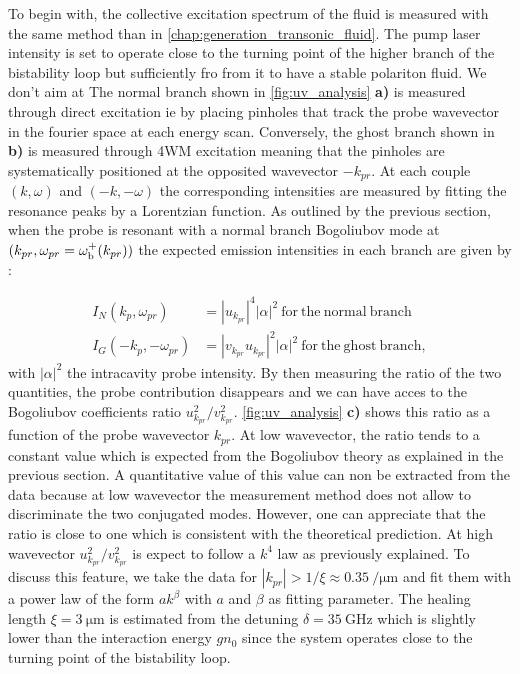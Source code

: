\bigskip

To begin with, the collective excitation spectrum of the fluid is measured with the same method than in \autoref{chap:generation_transonic_fluid}. The pump laser intensity is set to operate close to the turning point of the higher branch of the bistability loop but sufficiently  fro from it to have a stable polariton fluid. 
We don't aim at 
The normal branch shown in \autoref{fig:uv_analysis} \textbf{a)} is measured through direct excitation ie by placing pinholes that track the probe wavevector in the fourier space at each energy scan.
 Conversely, the ghost branch shown in \textbf{b)} is measured through 4WM excitation meaning that the pinholes are systematically positioned at the opposited wavevector $-k_{pr}$. At each couple $(k,\omega)$ and $(-k, -\omega)$ the corresponding intensities are measured by fitting the resonance peaks 
by a Lorentzian function. As outlined by the previous section, when the probe is resonant with a normal branch Bogoliubov mode at $(k_{pr}, \omega_{pr}=\omega_{\mathrm{b}}^+(k_{pr}))$ the expected emission intensities in each branch are given by :

\begin{equation}
    \label{eq:uv_intensity}
    \begin{aligned}
    I_N(k_p, \omega_{pr}) &= |u_{k_{pr}}|^4 |\alpha|^2  \  \mathrm{for \ the \ normal \ branch } \\
    I_G(-k_p, -\omega_{pr}) &= |v_{k_{pr}}u_{k_{pr}}|^2 |\alpha|^2 \ \mathrm{ for \ the \ ghost \  branch,}
    \end{aligned}
\end{equation}
with $|\alpha|^2$ the intracavity probe intensity. By then measuring the ratio of the two quantities, the probe contribution disappears and we can have acces to the Bogoliubov coefficients ratio $u_{k_{pr}}^2/v_{k_{pr}}^2$. 
\autoref{fig:uv_analysis} \textbf{c)} shows this ratio as a function of the probe wavevector $k_{pr}$. At low wavevector, the ratio tends to a constant value which is expected from the Bogoliubov theory as explained in the previous section. A quantitative value of this value can non be extracted from the data
because at low wavevector the measurement method does not allow to discriminate the two conjugated modes. However, one can appreciate that the ratio is close to one which is consistent with the theoretical prediction.
At high wavevector $u_{k_{pr}}^2/v_{k_{pr}}^2$ is expect to follow a $k^4$ law as previously explained. To discuss this feature, we take the data for $|k_{pr}| > 1/\xi\approx\SI{0.35}{\per\micro\meter}$ and fit them with a power law of the form $ak^\beta$ with $a$ and $\beta$ as fitting parameter. The healing length $\xi=\SI{3}{\micro\meter}$ is estimated from the detuning $\delta =\SI{35}{\giga\hertz}$ which is slightly lower than the interaction energy $gn_0$ since the system operates close to the turning point of the bistability loop.

